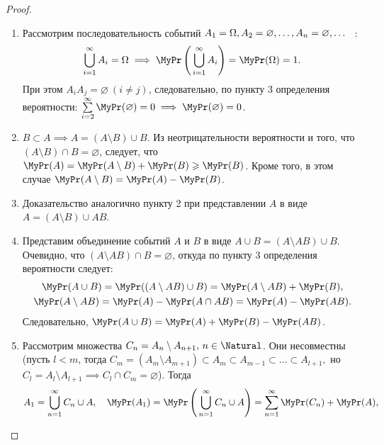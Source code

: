 \begin{proof}\leavevmode
	\begin{enumerate}
		\item 
		      Рассмотрим последовательность событий $A_{1} = \Omega, A_{2} = \varnothing, \ldots, \\ 
		      A_{n} = \varnothing, \ldots$ \, :
		      \begin{equation*}
		      	\bigcup\limits_{i=1}^\infty A_i = \Omega \implies \MyPr \left(\, \bigcup\limits_{i=1}^\infty A_i \right) = \MyPr(\Omega) = 1.
		      \end{equation*}
		      При этом $A_{i}A_j = \varnothing~(i \ne j)$, следовательно, по пункту 3 определения вероятности: $\sum\limits_{i=2}^\infty \MyPr(\varnothing) = 0 \implies \MyPr(\varnothing) = 0$.
		\item 
		      $B \subset A \implies A = (A \setminus B) \cup B$. 
		      Из неотрицательности вероятности и того, что $(A \setminus B) \cap B = \varnothing$, следует, что $\MyPr(A) = \MyPr(A \setminus B) + \MyPr(B) \geqslant \MyPr(B)$. 
		      Кроме того, в этом случае $\MyPr(A \setminus B) = \MyPr(A) - \MyPr(B)$.
		\item 
		      Доказательство аналогично пункту 2 при представлении $A$ в виде \\
		      $A = (A \setminus B) \cup AB$.
		\item 
		      Представим объединение событий $A$ и $B$ в виде $A \cup B = (A \setminus AB) \cup B$. 
		      Очевидно, что $(A \setminus AB) \cap B = \varnothing$, откуда по пункту 3 определения вероятности следует:
		      \begin{gather*}
		      	\MyPr(A \cup B) = \MyPr((A \setminus AB) \cup B) = \MyPr(A \setminus AB) + \MyPr(B), \\
		      	\MyPr(A \setminus AB) = \MyPr(A) - \MyPr(A \cap AB) = \MyPr(A) - \MyPr(AB).
		      \end{gather*}
		      Следовательно, $\MyPr(A \cup B) = \MyPr(A) + \MyPr(B) - \MyPr(AB)$.
		\item 
		      Рассмотрим множества $C_n = A_n \setminus A_{n+1}, \, n \in \Natural$. 
		      Они несовместны (пусть $l < m$, тогда $C_m = (A_m \setminus A_{m+1}) \subset A_m \subset A_{m-1} \subset \ldots \subset A_{l+1},$ но $C_l = A_l \setminus A_{l+1} \implies C_l \cap C_m = \varnothing$). 
		      Тогда
		      \begin{gather*}
		      	A_1 = \bigcup\limits_{n = 1}^{\infty} C_n \cup A, \quad \MyPr(A_1) = \MyPr\left(\, \bigcup\limits_{n = 1}^{\infty} C_n \cup A \right) = \sum\limits_{n=1}^{\infty} \MyPr(C_n) + \MyPr(A), \\

\end{gather*}
\end{enumerate}
\end{proof}
